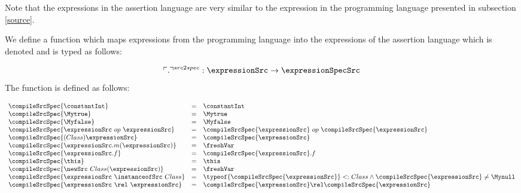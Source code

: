 Note that the expressions in the assertion language are very similar to the expression  in the programming language presented in subsection \ref{source}.

We define a function which maps expressions from the programming language into the expressions of the assertion language which 
is denoted and is typed as follows: 

$$\ulcorner . \urcorner^{\tiny{src2spec}} : \expressionSrc \rightarrow \expressionSpecSrc $$
The function is defined as follows:

$$ \begin{array}{lll}
      \compileSrcSpec{\constantInt} & = &  \constantInt\\
      \compileSrcSpec{\Mytrue} & = &  \Mytrue \\
      \compileSrcSpec{\Myfalse} & = &  \Myfalse \\
      \compileSrcSpec{\expressionSrc \ op \ \expressionSrc  } & = & \compileSrcSpec{\expressionSrc} \ op \ \compileSrcSpec{\expressionSrc  }  \\
      \compileSrcSpec{(Class)\expressionSrc } & = & \compileSrcSpec{\expressionSrc } \\
      \compileSrcSpec{\expressionSrc.m(\expressionSrc)} & = & \freshVar \\
      \compileSrcSpec{\expressionSrc.f }  & = & \compileSrcSpec{\expressionSrc }.f \\
      \compileSrcSpec{\this}  & = & \this \\
      \compileSrcSpec{  \newSrc \ Class  ( \expressionSrc  ) } & = &  \freshVar \\
      \compileSrcSpec{ \expressionSrc \ \instanceofSrc \ Class  } & = &  \typeof{\compileSrcSpec{ \expressionSrc} } <:  Class \wedge \compileSrcSpec{ \expressionSrc} \neq \Mynull  \\
      \compileSrcSpec{ \expressionSrc \ \rel \ \expressionSrc  } & = & \compileSrcSpec{  \expressionSrc } \rel \compileSrcSpec{  \expressionSrc } \\
      \end{array}
  $$
